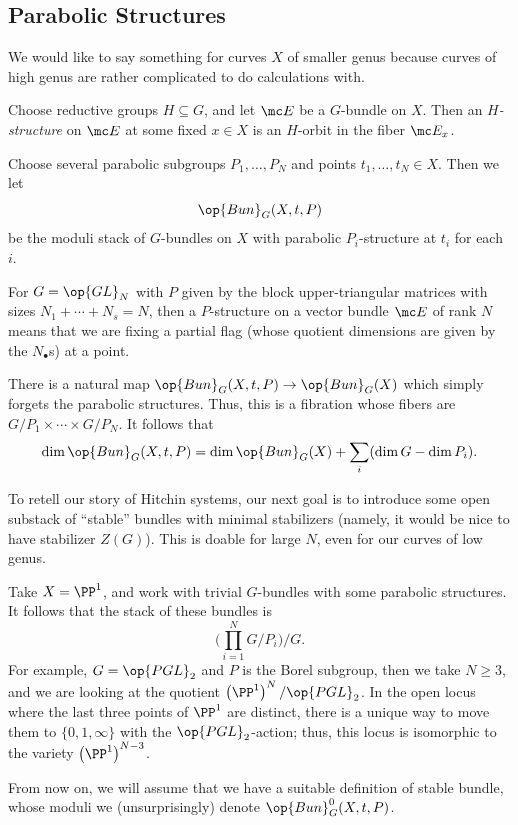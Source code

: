 \documentclass[../notes.tex]{subfiles}
\begin{document}
\subsection{Parabolic Structures}
We would like to say something for curves $X$ of smaller genus because curves of high genus are rather complicated to do calculations with.
\begin{definition}[structure]
	Choose reductive groups $H\subseteq G$, and let $\mc E$ be a $G$-bundle on $X$. Then an \textit{$H$-structure} on $\mc E$ at some fixed $x\in X$ is an $H$-orbit in the fiber $\mc E_x$.
\end{definition}
\begin{notation}
	Choose several parabolic subgroups $P_1,\ldots,P_N$ and points $t_1,\ldots,t_N\in X$. Then we let
	\[\op{Bun}_G(X,t,P)\]
	be the moduli stack of $G$-bundles on $X$ with parabolic $P_i$-structure at $t_i$ for each $i$.
\end{notation}
\begin{example}
	For $G=\op{GL}_N$ with $P$ given by the block upper-triangular matrices with sizes $N_1+\cdots+N_s=N$, then a $P$-structure on a vector bundle $\mc E$ of rank $N$ means that we are fixing a partial flag (whose quotient dimensions are given by the $N_\bullet$s) at a point.
\end{example}
\begin{remark}
	There is a natural map $\op{Bun}_G(X,t,P)\to\op{Bun}_G(X)$ which simply forgets the parabolic structures. Thus, this is a fibration whose fibers are $G/P_1\times\cdots\times G/P_N$. It follows that
	\[\dim\op{Bun}_G(X,t,P)=\dim\op{Bun}_G(X)+\sum_i(\dim G-\dim P_i).\]
\end{remark}
To retell our story of Hitchin systems, our next goal is to introduce some open substack of ``stable'' bundles with minimal stabilizers (namely, it would be nice to have stabilizer $Z(G)$). This is doable for large $N$, even for our curves of low genus.
\begin{example}
	Take $X=\PP^1$, and work with trivial $G$-bundles with some parabolic structures. It follows that the stack of these bundles is
	\[\Bigg(\prod_{i=1}^NG/P_i\Bigg)\mathbin{\bigg/}G.\]
	For example, $G=\op{PGL}_2$ and $P$ is the Borel subgroup, then we take $N\ge3$, and we are looking at the quotient $\left(\PP^1\right)^N/\op{PGL}_2$. In the open locus where the last three points of $\PP^1$ are distinct, there is a unique way to move them to $\{0,1,\infty\}$ with the $\op{PGL}_2$-action; thus, this locus is isomorphic to the variety $\left(\PP^1\right)^{N-3}$.
\end{example}
From now on, we will assume that we have a suitable definition of stable bundle, whose moduli we (unsurprisingly) denote $\op{Bun}_G^0(X,t,P)$.
\end{document}
